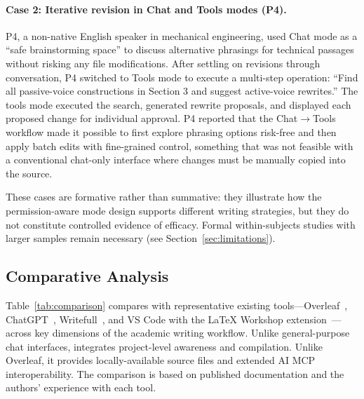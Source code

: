 \paragraph{Case 2: Iterative revision in Chat and Tools modes (P4).}
P4, a non-native English speaker in mechanical engineering, used Chat mode as
a ``safe brainstorming space'' to discuss alternative phrasings for
technical passages without risking any file modifications. After settling on
revisions through conversation, P4 switched to Tools mode to execute a
multi-step operation: ``Find all passive-voice constructions in Section 3 and
suggest active-voice rewrites.'' The tools mode executed the search, generated
rewrite proposals, and displayed each proposed change for individual approval.
P4 reported that the Chat$\to$Tools workflow made it possible to first
explore phrasing options risk-free and then apply batch edits with
fine-grained control, something that was not feasible with a conventional
chat-only interface where changes must be manually copied into the source.

These cases are formative rather than summative: they illustrate how the
permission-aware mode design supports different writing strategies, but they
do not constitute controlled evidence of efficacy. Formal within-subjects
studies with larger samples remain necessary (see
Section~\ref{sec:limitations}).

\subsection{Comparative Analysis}

Table~\ref{tab:comparison} compares \software{} with representative existing
tools---Overleaf~\cite{overleaf,overleaf2024ai}, ChatGPT~\cite{openai2023gpt4},
Writefull~\cite{writefull}, and VS Code with the \LaTeX{} Workshop
extension~\cite{vscodelatex}---across key dimensions of the academic writing
workflow. Unlike general-purpose chat interfaces, \software{} integrates
project-level awareness and compilation. Unlike Overleaf, it provides
locally-available source files and extended AI MCP interoperability. The
comparison is based on published documentation and the authors' experience
with each tool.

